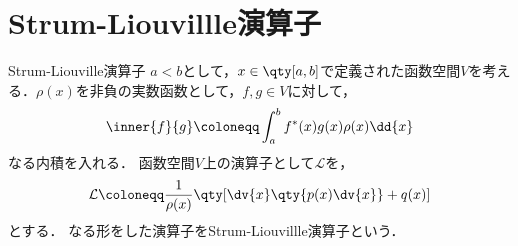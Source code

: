 \documentclass{report}
\begin{document}
    \section{Strum-Liouvillle演算子}
      \begin{mydef}{Strum-Liouville演算子}{}
        $a < b$として，$x\in \qty[a, b]$で定義された函数空間$V$を考える．$\rho(x)$を非負の実数函数として，$f, g\in V$に対して，
        \begin{align}
          \inner{f}{g} \coloneqq \int_{a}^{b} f^*(x)g(x)\rho(x)\dd{x}
        \end{align}
        なる内積を入れる．
        函数空間$V$上の演算子として$\mathcal{L}$を，
        \begin{align}
          \mathcal{L} \coloneqq \frac{1}{\rho(x)}\qty[\dv{x}\qty{p(x)\dv{x}} + q(x)]\label{strum-liouville-operator-def}
        \end{align}
        とする．
        なる形をした演算子をStrum-Liouvillle演算子という．
      \end{mydef}
\end{document}
